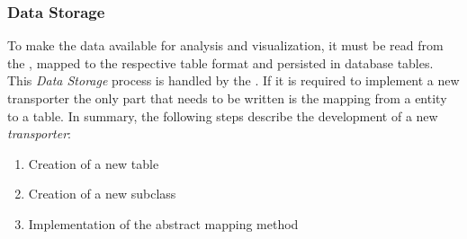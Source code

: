 \subsubsection{Data Storage}
\label{subsubsec:storage}
To make the data available for analysis and visualization, it must be read from the \gds{}, mapped to the respective table format and persisted in \pg{} database tables.
\newline
This \textit{Data Storage} process is handled by the .
If it is required to implement a new transporter the only part that needs to be written is the mapping from a \gds{} entity to a \pg{} table.
\newline
In summary, the following steps describe the development of a new \textit{transporter}:
\begin{enumerate}
  \item Creation of a new \pg{} table
  \item Creation of a new  subclass
  \item Implementation of the abstract mapping method
\end{enumerate}
